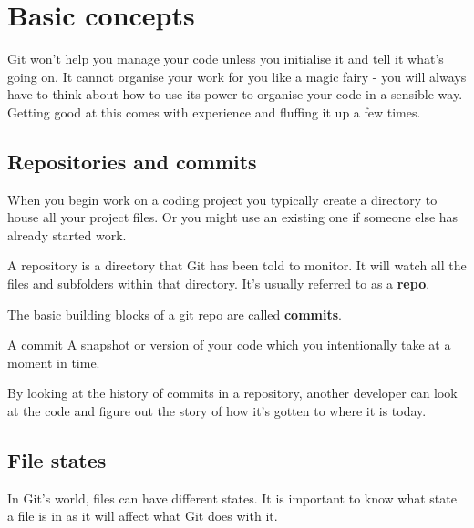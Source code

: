 \section{Basic concepts}

Git won't help you manage your code unless you initialise it and tell it what's going on. It cannot organise your work for you like a magic fairy - you will always have to think about how to use its power to organise your code in a sensible way. 
\\

Getting good at this comes with experience and fluffing it up a few times.


\subsection{Repositories and commits}

When you begin work on a coding project you typically create a directory to house all your project files. Or you might use an existing one if someone else has already started work.

\begin{infobox}{A repository}
	is a directory that Git has been told to monitor. It will watch all the files and subfolders within that directory. It's usually referred to as a \textbf{repo}.
\end{infobox}

The basic building blocks of a git repo are called \textbf{commits}.

\begin{infobox}{A commit}
	A snapshot or version of your code which you intentionally take at a moment in time. 
\end{infobox}

By looking at the history of commits in a repository, another developer can look at the code and figure out the story of how it's gotten to where it is today.



\subsection{File states}

In Git's world, files can have different states. It is important to know what state a file is in as it will affect what Git does with it. 
\\

